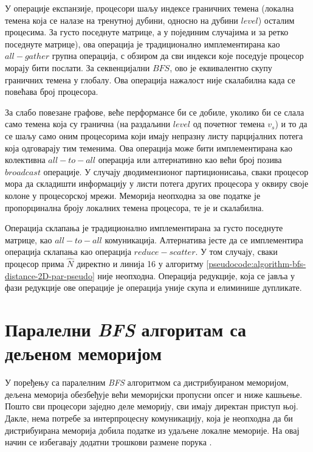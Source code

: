 \par
У операције експанзије, процесори шаљу индексе граничних темена (локална темена која се налазе на тренутној дубини, односно на дубини $level$) осталим процесима. За густо поседнуте матрице, а у појединим случајима и за ретко поседнуте матрице), ова операција је традиционално имплементирана као $all-gather$ групна операција, с обзиром да сви индекси које поседује процесор морају бити послати. За секвенцијални $BFS$, ово је еквивалентно скупу граничних темена у глобалу. Ова операција нажалост није скалабилна када се повећава број процесора.

\par
За слабо повезане графове, веће перформансе би се добиле, уколико би се слала само темена која су гранична (на раздаљини $level$
од почетног темена $v_s$) и то да се шаљу само оним процесорима који имају непразну листу парцијалних потега која одговарају тим теменима. Ова операција може бити имплементирана као колективна $all-to-all$ операција или алтернативно као већи број позива $broadcast$ операције. У случају дводимензионог партиционисања, сваки процесор мора да складишти информацију у листи потега других процесора у оквиру своје колоне у процесорској мрежи. Меморија неопходна за ове податке је пропорцинална броју локалних темена процесора, те је и скалабилна.

\par
Операција склапања је традиционално имплементирана за густо поседнуте матрице, као $all-to-all$ комуникација. Алтернатива јесте да се имплементира операција склапања као операција $reduce-scatter$. У том случају, сваки процесор прима $\widehat{N}$ директно и линија 16 у алгоритму \ref{pseudocode:algorithm-bfs-distance-2D-par-pseudo} није неопходна. Операција редукције, која се јавља у фази редукције ове операције је операција уније скупа и елиминише дупликате.

\section{Паралелни \textit{BFS} алгоритам са дељеном меморијом}
У поређењу са паралелним \textit{BFS} алгоритмом са дистрибуираном меморијом, дељена меморија обезбеђује већи меморијски пропусни опсег и ниже кашњење. Пошто сви процесори заједно деле меморију, сви имају директан приступ њој. Дакле, нема потребе за интерпроцесну комуникацију, која је неопходна да би дистрибуирана меморија добила податке из удаљене локалне меморије. На овај начин се избегавају додатни трошкови размене порука \cite{bfs-par}.

